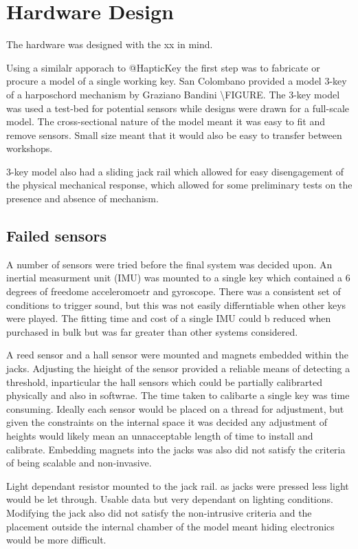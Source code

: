 \section{Hardware Design}\label{hardware-design}

The hardware was designed with the xx in mind.

Using a similalr apporach to @HapticKey the first step was to fabricate
or procure a model of a single working key. San Colombano provided a
model 3-key of a harposchord mechanism by Graziano Bandini
\textbackslash FIGURE. The 3-key model was used a test-bed for potential
sensors while designs were drawn for a full-scale model. The
cross-sectional nature of the model meant it was easy to fit and remove
sensors. Small size meant that it would also be easy to transfer between
workshops.

3-key model also had a sliding jack rail which allowed for easy
disengagement of the physical mechanical response, which allowed for
some preliminary tests on the presence and absence of mechanism.

\subsection{Failed sensors}\label{failed-sensors}

A number of sensors were tried before the final system was decided upon.
An inertial measurment unit (IMU) was mounted to a single key which
contained a 6 degrees of freedome acceleromoetr and gyroscope. There was
a consistent set of conditions to trigger sound, but this was not easily
differntiable when other keys were played. The fitting time and cost of
a single IMU could b reduced when purchased in bulk but was far greater
than other systems considered.

A reed sensor and a hall sensor were mounted and magnets embedded within
the jacks. Adjusting the hieight of the sensor provided a reliable means
of detecting a threshold, inparticular the hall sensors which could be
partially calibrarted physically and also in softwrae. The time taken to
calibarte a single key was time consuming. Ideally each sensor would be
placed on a thread for adjustment, but given the constraints on the
internal space it was decided any adjustment of heights would likely
mean an unnacceptable length of time to install and calibrate. Embedding
magnets into the jacks was also did not satisfy the criteria of being
scalable and non-invasive.

Light dependant resistor mounted to the jack rail. as jacks were pressed
less light would be let through. Usable data but very dependant on
lighting conditions. Modifying the jack also did not satisfy the
non-intrusive criteria and the placement outside the internal chamber of
the model meant hiding electronics would be more difficult.

